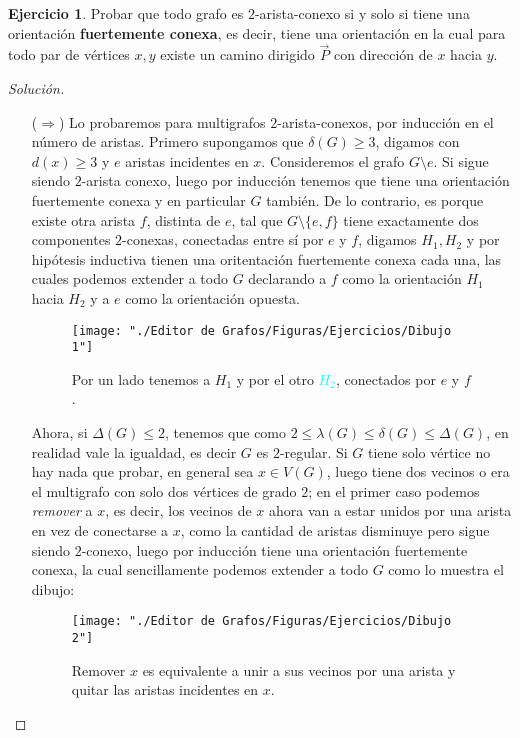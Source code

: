 \documentclass[12pt]{report}
\theoremstyle{plain}
\theoremstyle{definition}
\newtheorem{exercise}[theorem]{Ejercicio}
\newenvironment{solution}{\begin{proof}[Solución]}{\end{proof}}
\newcommand{\red}[1]{\textcolor{BrickRed}{#1}}
\newcommand{\blue}[1]{\textcolor{Cyan}{#1}}
\newcommand{\yellow}[1]{\textcolor{yellow!80!Black}{#1}} %
\begin{document}
\begin{exercise}\label{ejercicio:todo grafo es 2 arista conexo si y solo si tiene una orientacion fuertemente conexa}
Probar que todo grafo es $2$-arista-conexo si y solo si tiene una orientación \textbf{fuertemente conexa}, es
decir, tiene una orientación en la cual para todo par de vértices $x,y$ existe un camino dirigido $\overset{
\rightarrow}{P}$ con dirección de $x$ hacia $y$.
\end{exercise}
\begin{solution}
\begin{enumerate}
\item[($\Rightarrow$)] Lo probaremos para multigrafos $2$-arista-conexos, por inducción en el número de aristas.
Primero supongamos que $\delta (G) \geq 3$, digamos con $d(x) \geq 3$ y $e$ aristas incidentes en $x$.
Consideremos el grafo $G \setminus e$. Si sigue siendo $2$-arista conexo, luego por inducción tenemos que tiene
una orientación fuertemente conexa y en particular $G$ también. De lo contrario, es porque existe otra arista $f$, distinta de $e$, tal que $
G\setminus \{e,f\}$
tiene
exactamente dos componentes $2$-conexas, conectadas entre sí por $e$ y $f$, digamos $H_1,H_2$ y por hipótesis
inductiva
tienen una
oritentación
fuertemente conexa cada una, las cuales podemos extender a todo $G$ declarando a $f$ como la orientación $H_1$
hacia $H_2$ y a $e$ como la orientación opuesta.
\begin{figure}
\centering
\texttt{[image: "./Editor de Grafos/Figuras/Ejercicios/Dibujo 1"]}
\caption{Por un lado tenemos a \red{$H_1$} y por el otro \blue{$H_2$}, conectados por \yellow{$e$} y \yellow{$f$}.}
\end{figure}


Ahora, si $\Delta (G) \leq 2$, tenemos que como $2 \leq \lambda (G) \leq \delta (G) \leq \Delta (G)$, en realidad
vale la igualdad, es decir $G$ es $2$-regular. Si $G$ tiene solo vértice no hay nada que probar, en general sea $x \in V(G)$, luego tiene dos vecinos o era el multigrafo con solo dos vértices de grado $2$; en el primer caso podemos \textit{remover} a $x$, es decir, los vecinos de $x$ ahora van a estar unidos por una arista en vez de conectarse a $x$, como la cantidad de aristas disminuye pero sigue siendo $2$-conexo, luego por inducción tiene una orientación fuertemente conexa, la cual sencillamente podemos extender a todo $G$ como lo muestra el dibujo:
\begin{figure}
  \centering
  \texttt{[image: "./Editor de Grafos/Figuras/Ejercicios/Dibujo 2"]}
  \caption{Remover \red{$x$} es equivalente a unir a sus vecinos por una \yellow{arista} y quitar \red{las
  aristas
  incidentes} en
   \red{$x$}.}
\end{figure}



\end{enumerate}
\end{solution}
\end{document}
